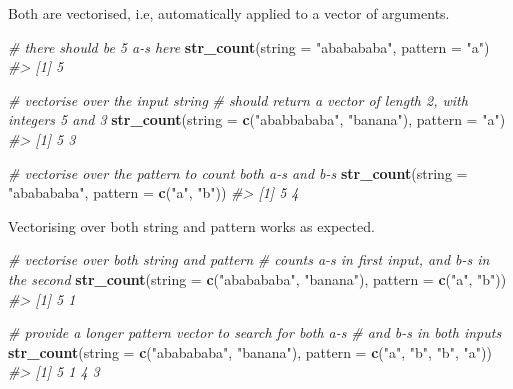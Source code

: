 \documentclass[]{book}
\newenvironment{Shaded}{}{}
\newcommand{\CommentTok}[1]{\textcolor[rgb]{0.38,0.63,0.69}{\textit{#1}}}
\newcommand{\DataTypeTok}[1]{\textcolor[rgb]{0.56,0.13,0.00}{#1}}
\newcommand{\KeywordTok}[1]{\textcolor[rgb]{0.00,0.44,0.13}{\textbf{#1}}}
\newcommand{\NormalTok}[1]{#1}
\newcommand{\StringTok}[1]{\textcolor[rgb]{0.25,0.44,0.63}{#1}}
\begin{document}
Both are vectorised, i.e, automatically applied to a vector of arguments.

\begin{Shaded}
\begin{Highlighting}[]
\CommentTok{# there should be 5 a-s here}
\KeywordTok{str_count}\NormalTok{(}\DataTypeTok{string =} \StringTok{"ababababa"}\NormalTok{, }\DataTypeTok{pattern =} \StringTok{"a"}\NormalTok{)}
\CommentTok{#> [1] 5}

\CommentTok{# vectorise over the input string}
\CommentTok{# should return a vector of length 2, with integers 5 and 3}
\KeywordTok{str_count}\NormalTok{(}\DataTypeTok{string =} \KeywordTok{c}\NormalTok{(}\StringTok{"ababbababa"}\NormalTok{, }\StringTok{"banana"}\NormalTok{), }\DataTypeTok{pattern =} \StringTok{"a"}\NormalTok{)}
\CommentTok{#> [1] 5 3}

\CommentTok{# vectorise over the pattern to count both a-s and b-s}
\KeywordTok{str_count}\NormalTok{(}\DataTypeTok{string =} \StringTok{"ababababa"}\NormalTok{, }\DataTypeTok{pattern =} \KeywordTok{c}\NormalTok{(}\StringTok{"a"}\NormalTok{, }\StringTok{"b"}\NormalTok{))}
\CommentTok{#> [1] 5 4}
\end{Highlighting}
\end{Shaded}

Vectorising over both string and pattern works as expected.

\begin{Shaded}
\begin{Highlighting}[]
\CommentTok{# vectorise over both string and pattern}
\CommentTok{# counts a-s in first input, and b-s in the second}
\KeywordTok{str_count}\NormalTok{(}\DataTypeTok{string =} \KeywordTok{c}\NormalTok{(}\StringTok{"ababababa"}\NormalTok{, }\StringTok{"banana"}\NormalTok{),}
          \DataTypeTok{pattern =} \KeywordTok{c}\NormalTok{(}\StringTok{"a"}\NormalTok{, }\StringTok{"b"}\NormalTok{))}
\CommentTok{#> [1] 5 1}

\CommentTok{# provide a longer pattern vector to search for both a-s}
\CommentTok{# and b-s in both inputs}
\KeywordTok{str_count}\NormalTok{(}\DataTypeTok{string =} \KeywordTok{c}\NormalTok{(}\StringTok{"ababababa"}\NormalTok{, }\StringTok{"banana"}\NormalTok{),}
          \DataTypeTok{pattern =} \KeywordTok{c}\NormalTok{(}\StringTok{"a"}\NormalTok{, }\StringTok{"b"}\NormalTok{,}
                      \StringTok{"b"}\NormalTok{, }\StringTok{"a"}\NormalTok{))}
\CommentTok{#> [1] 5 1 4 3}
\end{Highlighting}
\end{Shaded}
\end{document}
